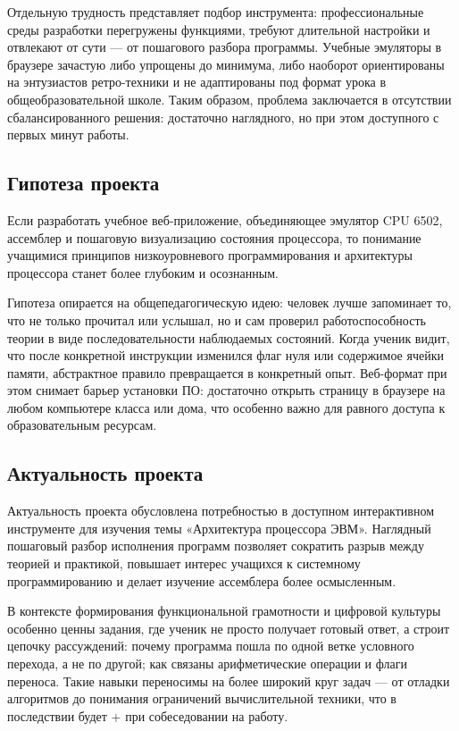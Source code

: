 \documentclass[12pt,a4paper]{article}
\begin{document}
Отдельную трудность представляет подбор инструмента: профессиональные среды разработки перегружены функциями, требуют длительной настройки и отвлекают от сути --- от пошагового разбора программы. Учебные эмуляторы в браузере зачастую либо упрощены до минимума, либо наоборот ориентированы на энтузиастов ретро-техники и не адаптированы под формат урока в общеобразовательной школе. Таким образом, проблема заключается в отсутствии сбалансированного решения: достаточно наглядного, но при этом доступного с первых минут работы.

\subsection{Гипотеза проекта}
Если разработать учебное веб-приложение, объединяющее эмулятор CPU 6502, ассемблер и пошаговую визуализацию состояния процессора, то понимание учащимися принципов низкоуровневого программирования и архитектуры процессора станет более глубоким и осознанным.

Гипотеза опирается на общепедагогическую идею: человек лучше запоминает то, что не только прочитал или услышал, но и сам проверил работоспособность теории в виде последовательности наблюдаемых состояний. Когда ученик видит, что после конкретной инструкции изменился флаг нуля или содержимое ячейки памяти, абстрактное правило превращается в конкретный опыт. Веб-формат при этом снимает барьер установки ПО: достаточно открыть страницу в браузере на любом компьютере класса или дома, что особенно важно для равного доступа к образовательным ресурсам.

\subsection{Актуальность проекта}
Актуальность проекта обусловлена потребностью в доступном интерактивном инструменте для изучения темы «Архитектура процессора ЭВМ». Наглядный пошаговый разбор исполнения программ позволяет сократить разрыв между теорией и практикой, повышает интерес учащихся к системному программированию и делает изучение ассемблера более осмысленным.

В контексте формирования функциональной грамотности и цифровой культуры особенно ценны задания, где ученик не просто получает готовый ответ, а строит цепочку рассуждений: почему программа пошла по одной ветке условного перехода, а не по другой; как связаны арифметические операции и флаги переноса. Такие навыки переносимы на более широкий круг задач --- от отладки алгоритмов до понимания ограничений вычислительной техники, что в последствии будет + при собеседовании на работу.
\end{document}
